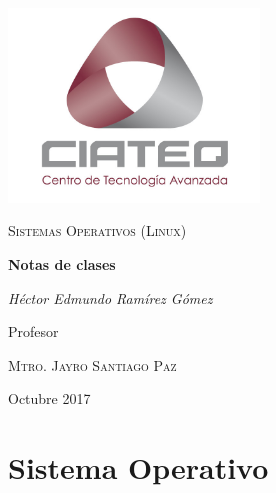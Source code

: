 \documentclass[12pt,a4paper]{report}
\begin{document}
\begin{titlepage}

	\centering
	\includegraphics[width=0.5\textwidth]{../images/ciateq.jpg}\par\vspace{1cm}
	\vspace{1cm}
	{\scshape\Large Sistemas Operativos (Linux)\par}
	\vspace{1.5cm}
	{\huge\bfseries Notas de clases\par}
	\vspace{2cm}
	{\Large\itshape H\'{e}ctor Edmundo Ram\'{i}rez G\'{o}mez\par}
	\vfill
	Profesor\par
	\textsc{Mtro. Jayro Santiago Paz}
	\vfill

	{\large \date sOctubre 2017\par}
\end{titlepage}

\chapter{Sistema Operativo}
\end{document}
